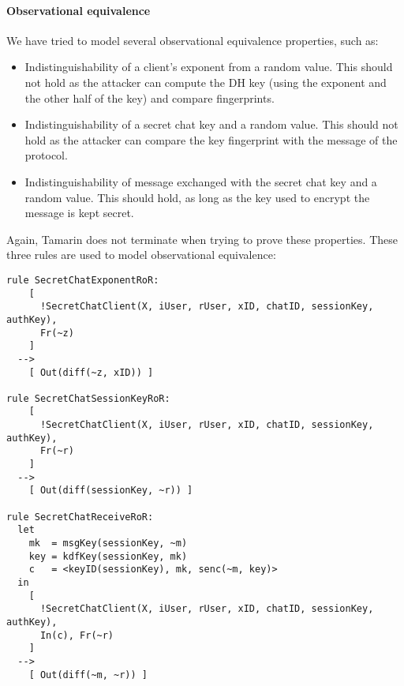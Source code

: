 \paragraph{Observational equivalence} We have tried to model several observational equivalence properties, such as:
\begin{itemize}
  \item Indistinguishability of a client's exponent from a random value. This should not hold as the attacker can compute the DH key (using the exponent and the other half of the key) and compare fingerprints.
  \item Indistinguishability of a secret chat key and a random value. This should not hold as the attacker can compare the key fingerprint with the  message of the protocol.
  \item Indistinguishability of message exchanged with the secret chat key and a random value. This should hold, as long as the key used to encrypt the message is kept secret.
\end{itemize}

Again, Tamarin does not terminate when trying to prove these properties. These three rules are used to model observational equivalence:

\begin{lstlisting}
rule SecretChatExponentRoR:
    [
      !SecretChatClient(X, iUser, rUser, xID, chatID, sessionKey, authKey),
      Fr(~z)
    ]
  -->
    [ Out(diff(~z, xID)) ]

rule SecretChatSessionKeyRoR:
    [ 
      !SecretChatClient(X, iUser, rUser, xID, chatID, sessionKey, authKey),
      Fr(~r)
    ]
  -->
    [ Out(diff(sessionKey, ~r)) ]

rule SecretChatReceiveRoR:
  let
    mk  = msgKey(sessionKey, ~m)
    key = kdfKey(sessionKey, mk)
    c   = <keyID(sessionKey), mk, senc(~m, key)>
  in
    [ 
      !SecretChatClient(X, iUser, rUser, xID, chatID, sessionKey, authKey),
      In(c), Fr(~r)
    ]
  -->
    [ Out(diff(~m, ~r)) ]
\end{lstlisting}
